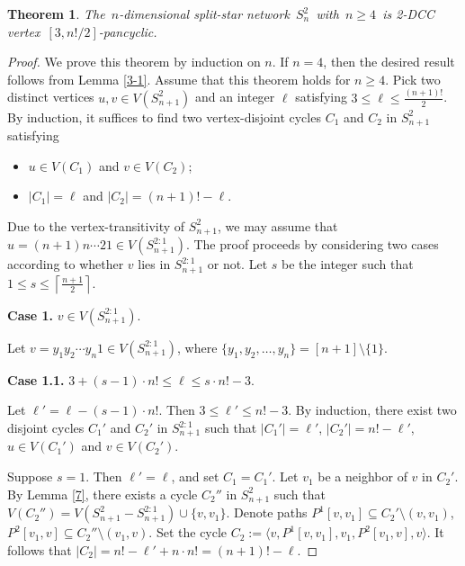 \documentclass[12pt,a4paper]{amsart}
\newtheorem{thm}{Theorem}[section]
\theoremstyle{definition}
\begin{document}
	\begin{thm}\label{3-3}
		The~$n$-dimensional split-star network~$S_n^2$~with~$n\ge4$~is 2-DCC vertex~$[3,n!/2]$-pancyclic.
	\end{thm}
\begin{proof}
We prove this theorem by induction on $n$. If $n=4$, then the desired result follows from Lemma \ref{3-1}. Assume that this theorem holds for $n\ge 4$. Pick two distinct vertices $u,v\in V(S_{n+1}^2)$ and an integer $\ell$ satisfying $3\le \ell \le \frac{(n+1)!}{2}$. By induction, it suffices to find two vertex-disjoint cycles $C_1$ and $C_2$ in $S_{n+1}^2$ satisfying
\begin{itemize}
\item $u\in V(C_1)$ and $v\in V(C_2)$;
\item $|C_1|=\ell$ and $|C_2|=(n+1)!-\ell$.
\end{itemize}

Due to the vertex-transitivity of $S_{n+1}^2$, we may assume that $u=(n+1)n\cdots21\in V(S_{n+1}^{2:1})$. The proof proceeds by considering two cases according to whether $v$ lies in $S_{n+1}^{2:1}$ or not. Let $s$ be the integer such that $1\le s\le \left\lceil \frac{n+1}{2}\right\rceil$.


\textbf{Case 1.} $v\in V(S_{n+1}^{2:1})$.

Let $v=y_1y_2\cdots y_n1\in V(S_{n+1}^{2:1})$, where $\{y_1,y_2,\ldots,y_n\}=[n+1]\setminus\{1\}$.


\textbf{Case 1.1.} $3+(s-1)\cdot n!\le \ell \le s\cdot n!-3$.

Let $\ell'=\ell-(s-1)\cdot n!$. Then $3\le \ell' \le n!-3$. By induction, there exist two disjoint cycles $C_1'$ and $C_2'$ in $S_{n+1}^{2:1}$ such that $|C_1'|=\ell'$, $|C_2'|=n!-\ell'$, $u\in V(C_1')$ and $v\in V(C_2')$.


Suppose $s=1$. Then $\ell'=\ell$, and set $C_1=C_1'$. Let $v_1$ be a neighbor of $v$ in $C_2'$. By Lemma \ref{7}, there exists a cycle $C_2''$ in $S_{n+1}^2$ such that $V(C_2'')=V(S_{n+1}^2-S_{n+1}^{2:1})\cup\{v,v_1\}$. Denote paths $P^1[v,v_1]\subseteq C_2'\setminus(v,v_1)$, $P^2[v_1,v]\subseteq C_2''\setminus(v_1,v)$. Set the cycle $C_2:=\langle v,P^1[v,v_1],v_1,P^2[v_1,v],v\rangle$. It follows that $|C_2|=n!-\ell' + n\cdot n! = (n+1)!-\ell$.


\end{proof}
\end{document}
